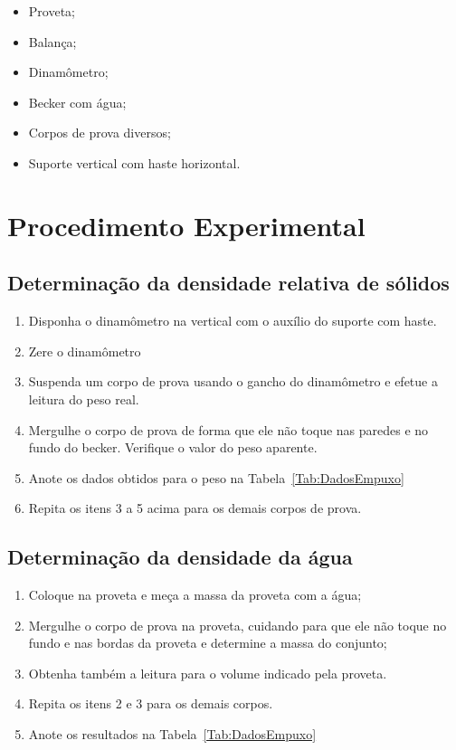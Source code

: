 \begin{itemize}
	\item Proveta;
	\item Balança;
	\item Dinamômetro;
	\item Becker com água;
	\item Corpos de prova diversos;
	\item Suporte vertical com haste horizontal.
\end{itemize}

\section{Procedimento Experimental}

\subsection{Determinação da densidade relativa de sólidos}
\begin{enumerate}
	\item Disponha o dinamômetro na vertical com o auxílio do suporte com haste.
	\item Zere o dinamômetro
	\item Suspenda um corpo de prova usando o gancho do dinamômetro e efetue a leitura do peso real.
	\item Mergulhe o corpo de prova de forma que ele não toque nas paredes e no fundo do becker. Verifique o valor do peso aparente.
	\item Anote os dados obtidos para o peso na Tabela~\ref{Tab:DadosEmpuxo}
	\item Repita os itens 3 a 5 acima para os demais corpos de prova.
\end{enumerate}

\subsection{Determinação da densidade da água}
\begin{enumerate}
\item Coloque  na proveta e meça a massa da proveta com a água;
\item Mergulhe o corpo de prova na proveta, cuidando para que ele não toque no fundo e nas bordas da proveta e determine a massa do conjunto;
\item Obtenha também a leitura para o volume indicado pela proveta.
\item Repita os itens 2 e 3 para os demais corpos.
\item Anote os resultados na Tabela~\ref{Tab:DadosEmpuxo}
\end{enumerate}

